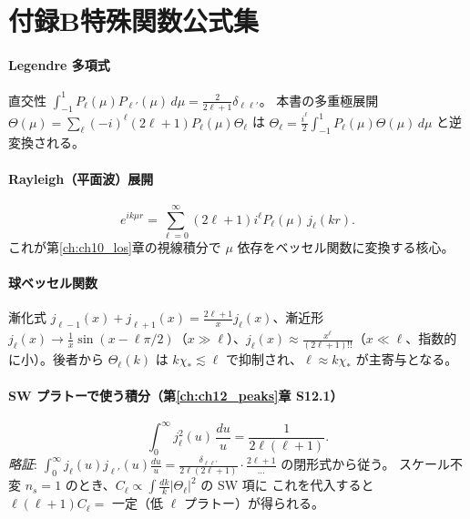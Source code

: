 \section*{付録B\quad 特殊関数公式集}

\paragraph{Legendre 多項式}
直交性 $\int_{-1}^{1}P_\ell(\mu)P_{\ell'}(\mu)\,d\mu=\frac{2}{2\ell+1}\delta_{\ell\ell'}$。
本書の多重極展開 $\Theta(\mu)=\sum_\ell(-i)^\ell(2\ell+1)P_\ell(\mu)\Theta_\ell$ は
$\Theta_\ell=\frac{i^\ell}{2}\int_{-1}^1 P_\ell(\mu)\Theta(\mu)\,d\mu$ と逆変換される。

\paragraph{Rayleigh（平面波）展開}
\begin{equation}
  e^{ik\mu r}=\sum_{\ell=0}^{\infty}(2\ell+1)i^\ell P_\ell(\mu)\,j_\ell(kr).
\end{equation}
これが第\ref{ch:ch10_los}章の視線積分で $\mu$ 依存をベッセル関数に変換する核心。

\paragraph{球ベッセル関数}
漸化式 $j_{\ell-1}(x)+j_{\ell+1}(x)=\frac{2\ell+1}{x}j_\ell(x)$、漸近形
$j_\ell(x)\to\frac{1}{x}\sin(x-\ell\pi/2)$（$x\gg\ell$）、$j_\ell(x)\approx
\frac{x^\ell}{(2\ell+1)!!}$（$x\ll\ell$、指数的に小）。後者から $\Theta_\ell(k)$ は
$k\chi_*\lesssim\ell$ で抑制され、$\ell\approx k\chi_*$ が主寄与となる。

\paragraph{SW プラトーで使う積分（第\ref{ch:ch12_peaks}章 S12.1）}
\begin{equation}
  \int_0^\infty j_\ell^2(u)\,\frac{du}{u}=\frac{1}{2\ell(\ell+1)}.
\end{equation}
\textit{略証}: $\int_0^\infty j_\ell(u)j_{\ell'}(u)\frac{du}{u}
=\frac{\delta_{\ell\ell'}}{2\ell(2\ell+1)}\cdot\frac{2\ell+1}{...}$ の閉形式から従う。
スケール不変 $n_s=1$ のとき、$C_\ell\propto\int\frac{dk}{k}|\Theta_\ell|^2$ の SW 項に
これを代入すると $\ell(\ell+1)C_\ell=$ 一定（低 $\ell$ プラトー）が得られる。
